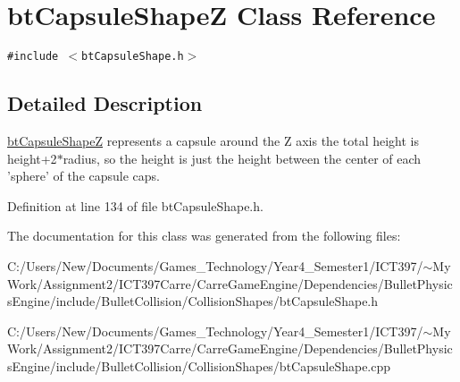 \hypertarget{classbt_capsule_shape_z}{
\section{btCapsuleShapeZ Class Reference}
\label{classbt_capsule_shape_z}
}
{\tt \#include $<$btCapsuleShape.h$>$}



\subsection{Detailed Description}
\hyperlink{classbt_capsule_shape_z}{btCapsuleShapeZ} represents a capsule around the Z axis the total height is height+2$\ast$radius, so the height is just the height between the center of each 'sphere' of the capsule caps. 

Definition at line 134 of file btCapsuleShape.h.

The documentation for this class was generated from the following files:\begin{CompactItemize}
\item 
C:/Users/New/Documents/Games\_\-Technology/Year4\_\-Semester1/ICT397/$\sim$My Work/Assignment2/ICT397Carre/CarreGameEngine/Dependencies/BulletPhysicsEngine/include/BulletCollision/CollisionShapes/btCapsuleShape.h\item 
C:/Users/New/Documents/Games\_\-Technology/Year4\_\-Semester1/ICT397/$\sim$My Work/Assignment2/ICT397Carre/CarreGameEngine/Dependencies/BulletPhysicsEngine/include/BulletCollision/CollisionShapes/btCapsuleShape.cpp\end{CompactItemize}
